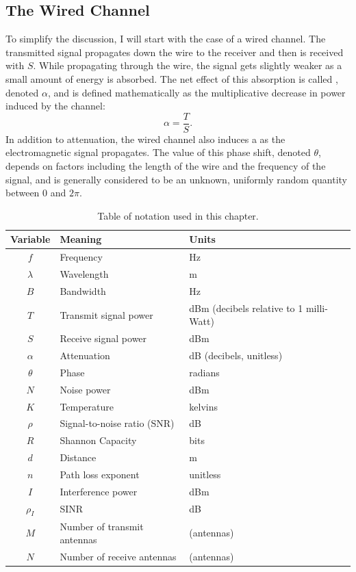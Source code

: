 \subsection{The Wired Channel}
To simplify the discussion, I will start with the case of a wired channel. The transmitted signal propagates down the wire to the receiver and then is received with  $S$. While propagating through the wire, the signal gets slightly weaker as a small amount of energy is absorbed. The net effect of this absorption is called , denoted $\alpha$, and is defined mathematically as the multiplicative decrease in power induced by the channel:
\begin{equation}
	\label{eq:attenuation}
	\alpha = \frac{T}{S}.
\end{equation}
In addition to attenuation, the wired channel also induces a  as the electromagnetic signal propagates. The value of this phase shift, denoted $\theta$, depends on factors including the length of the wire and the frequency of the signal, and is generally considered to be an unknown, uniformly random quantity between $0$ and $2\pi$.

\begin{table}
\centering
\begin{tabular}{cll}
\toprule%
Variable & Meaning & Units\\
\midrule%
$f$ & Frequency & Hz \\
$\lambda$ & Wavelength & m \\
$B$ & Bandwidth & Hz \\
$T$ & Transmit signal power & dBm (decibels relative to 1 milli-Watt) \\
$S$ & Receive signal power & dBm \\
$\alpha$ & Attenuation & dB (decibels, unitless) \\
$\theta$ & Phase & radians \\
$N$ & Noise power & dBm \\
$K$ & Temperature & kelvins \\
$\rho$ & Signal-to-noise ratio (SNR) & dB \\
$R$ & Shannon Capacity & bits \\
$d$ & Distance & m \\
$n$ & Path loss exponent & unitless \\
$I$ & Interference power & dBm \\
$\rho_I$ & SINR & dB \\
$M$ & Number of transmit antennas & (antennas) \\
$N$ & Number of receive antennas & (antennas)\\
\bottomrule
\end{tabular}
\caption[Table of notation used in this chapter]{\label{tab:bg_notation}Table of notation used in this chapter.}
\end{table}

